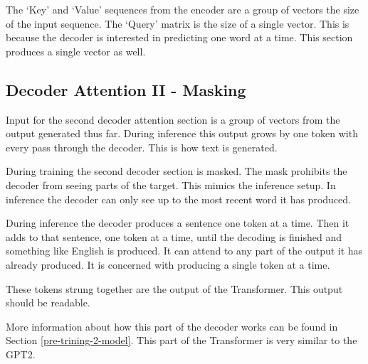 The `Key' and `Value' sequences from the encoder are a group of vectors the size of the input sequence. The `Query' matrix is the size of a single vector. This is because the decoder is interested in predicting one word at a time. This section produces a single vector as well.


\subsection{Decoder Attention II - Masking}
Input for the second decoder attention section is a group of vectors from the output generated thus far. During inference this output grows by one token with every pass through the decoder. This is how text is generated.

During training the second decoder section is masked. The mask prohibits the decoder from seeing parts of the target. This mimics the inference setup. In inference the decoder can only see up to the most recent word it has produced.

During inference the decoder produces a sentence one token at a time. Then it adds to that sentence, one token at a time, until the decoding is finished and something like English is produced. It can attend to any part of the output it has already produced. It is concerned with producing a single token at a time.

These tokens strung together are the output of the Transformer. This output should be readable. %

More information about how this part of the decoder works can be found in Section  \ref{pre-trining-2-model}. This part of the Transformer is very similar to the GPT2.

